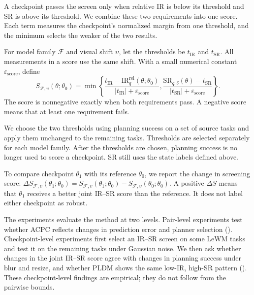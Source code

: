 \documentclass[10pt]{article}
\begin{document}
A checkpoint passes the screen only when relative IR is below its threshold
and SR is above its threshold. We combine these two requirements into one
score. Each term measures the checkpoint's normalized margin from one
threshold, and the minimum selects the weaker of the two results.

For model family $\mathcal F$ and visual shift $\upsilon$, let the thresholds
be $t_{\mathrm{IR}}$ and $t_{\mathrm{SR}}$. All measurements in a score use
the same shift. With a small numerical constant
$\varepsilon_{\mathrm{score}}$, define
\begin{equation}
S_{\mathcal F,\upsilon}(\theta;\theta_0)
=
\min\!\left\{
\frac{t_{\mathrm{IR}}-\mathrm{IR}^{\mathrm{rel}}_{q}(\theta;\theta_0)}
{|t_{\mathrm{IR}}|+\varepsilon_{\mathrm{score}}},
\frac{\mathrm{SR}_{q,\delta}(\theta)-t_{\mathrm{SR}}}
{|t_{\mathrm{SR}}|+\varepsilon_{\mathrm{score}}}
\right\}.
\label{eq:ir-sr-score}
\end{equation}
The score is nonnegative exactly when both requirements pass. A negative
score means that at least one requirement fails.

We choose the two thresholds using planning success on a set of source tasks
and apply them unchanged to the remaining tasks. Thresholds are selected
separately for each model family. After the thresholds are chosen, planning
success is no longer used to score a checkpoint. SR still uses the state
labels defined above.

To compare checkpoint $\theta_1$ with its reference $\theta_0$, we report the
change in screening score:
$\Delta S_{\mathcal F,\upsilon}(\theta_1;\theta_0)
=S_{\mathcal F,\upsilon}(\theta_1;\theta_0)
-S_{\mathcal F,\upsilon}(\theta_0;\theta_0)$.
A positive $\Delta S$ means that $\theta_1$ receives a better joint IR--SR
score than the reference. It does not label either checkpoint as robust.

The experiments evaluate the method at two levels. Pair-level experiments
test whether ACPC reflects changes in prediction error and planner selection
(). Checkpoint-level experiments
first select an IR--SR screen on some LeWM tasks and test it on the remaining
tasks under Gaussian noise. We then ask whether changes in the joint IR--SR
score agree with changes in planning success under blur and resize, and
whether PLDM shows the same low-IR, high-SR pattern
().
These checkpoint-level findings are empirical; they do not follow from the
pairwise bounds.
\end{document}
